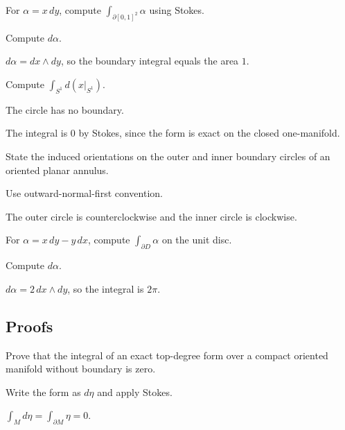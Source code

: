 \begin{exercise}\label{exr:vii11-ped-02}
For \(\alpha=x\,dy\), compute \(\int_{\partial[0,1]^2}\alpha\) using Stokes.
\end{exercise}
\begin{hint}
Compute \(d\alpha\).
\end{hint}
\begin{solution}
\(d\alpha=dx\wedge dy\), so the boundary integral equals the area \(1\).
\end{solution}

\begin{exercise}\label{exr:vii11-ped-03}
Compute \(\int_{S^1} d(x|_{S^1})\).
\end{exercise}
\begin{hint}
The circle has no boundary.
\end{hint}
\begin{solution}
The integral is \(0\) by Stokes, since the form is exact on the closed one-manifold.
\end{solution}

\begin{exercise}\label{exr:vii11-ped-04}
State the induced orientations on the outer and inner boundary circles of an oriented planar annulus.
\end{exercise}
\begin{hint}
Use outward-normal-first convention.
\end{hint}
\begin{solution}
The outer circle is counterclockwise and the inner circle is clockwise.
\end{solution}

\begin{exercise}\label{exr:vii11-ped-05}
For \(\alpha=x\,dy-y\,dx\), compute \(\int_{\partial D}\alpha\) on the unit disc.
\end{exercise}
\begin{hint}
Compute \(d\alpha\).
\end{hint}
\begin{solution}
\(d\alpha=2\,dx\wedge dy\), so the integral is \(2\pi\).
\end{solution}

\subsection*{Proofs}

\begin{exercise}\label{exr:vii11-ped-06}
Prove that the integral of an exact top-degree form over a compact oriented manifold without boundary is zero.
\end{exercise}
\begin{hint}
Write the form as \(d\eta\) and apply Stokes.
\end{hint}
\begin{solution}
\(\int_M d\eta=\int_{\partial M}\eta=0\).
\end{solution}

